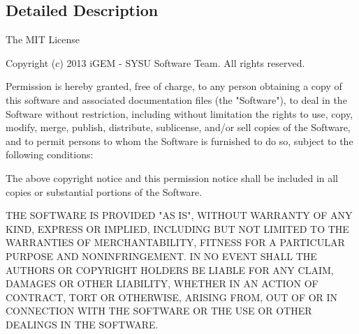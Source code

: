 \subsection{Detailed Description}
\begin{DoxyVerb}The MIT License

Copyright (c) 2013 iGEM - SYSU Software Team. All rights reserved.

Permission is hereby granted, free of charge, to any person obtaining a copy
of this software and associated documentation files (the "Software"), to deal
in the Software without restriction, including without limitation the rights
to use, copy, modify, merge, publish, distribute, sublicense, and/or sell
copies of the Software, and to permit persons to whom the Software is
furnished to do so, subject to the following conditions:

The above copyright notice and this permission notice shall be included in
all copies or substantial portions of the Software.

THE SOFTWARE IS PROVIDED "AS IS", WITHOUT WARRANTY OF ANY KIND, EXPRESS OR
IMPLIED, INCLUDING BUT NOT LIMITED TO THE WARRANTIES OF MERCHANTABILITY,
FITNESS FOR A PARTICULAR PURPOSE AND NONINFRINGEMENT. IN NO EVENT SHALL THE
AUTHORS OR COPYRIGHT HOLDERS BE LIABLE FOR ANY CLAIM, DAMAGES OR OTHER
LIABILITY, WHETHER IN AN ACTION OF CONTRACT, TORT OR OTHERWISE, ARISING FROM,
OUT OF OR IN CONNECTION WITH THE SOFTWARE OR THE USE OR OTHER DEALINGS IN
THE SOFTWARE.
\end{DoxyVerb}
 